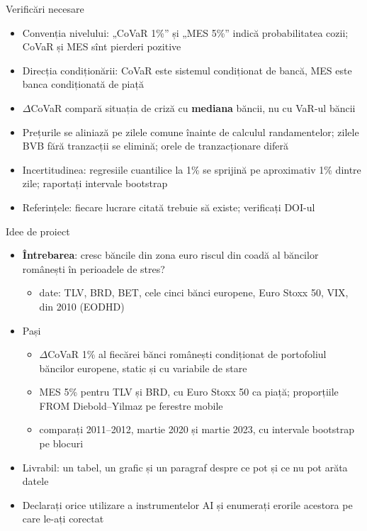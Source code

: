 \begin{frame}{Verificări necesare}
\itemsize{\small}
\begin{itemize}
    \item Convenția nivelului: „CoVaR 1\%” și „MES 5\%” indică probabilitatea cozii; CoVaR și MES sînt pierderi pozitive
    \item Direcția condiționării: CoVaR este sistemul condiționat de bancă, MES este banca condiționată de piață
    \item $\Delta$CoVaR compară situația de criză cu \textbf{mediana} băncii, nu cu VaR-ul băncii
    \item Prețurile se aliniază pe zilele comune înainte de calculul randamentelor; zilele BVB fără tranzacții se elimină; orele de tranzacționare diferă
    \item Incertitudinea: regresiile cuantilice la 1\% se sprijină pe aproximativ 1\% dintre zile; raportați intervale bootstrap
    \item Referințele: fiecare lucrare citată trebuie să existe; verificați DOI-ul
\end{itemize}
\end{frame}

\begin{frame}{Idee de proiect}
\itemsize{\small}
\begin{itemize}
    \item \textbf{Întrebarea}: cresc băncile din zona euro riscul din coadă al băncilor românești în perioadele de stres?
    \begin{itemize}
        \item date: TLV, BRD, BET, cele cinci bănci europene, Euro Stoxx 50, VIX, din 2010 (EODHD)
    \end{itemize}
    \item Pași
    \begin{itemize}
        \item $\Delta$CoVaR 1\% al fiecărei bănci românești condiționat de portofoliul băncilor europene, static și cu variabile de stare
        \item MES 5\% pentru TLV și BRD, cu Euro Stoxx 50 ca piață; proporțiile FROM Diebold--Yilmaz pe ferestre mobile
        \item comparați 2011--2012, martie 2020 și martie 2023, cu intervale bootstrap pe blocuri
    \end{itemize}
    \item Livrabil: un tabel, un grafic și un paragraf despre ce pot și ce nu pot arăta datele
    \item Declarați orice utilizare a instrumentelor AI și enumerați erorile acestora pe care le-ați corectat
\end{itemize}
\end{frame}


